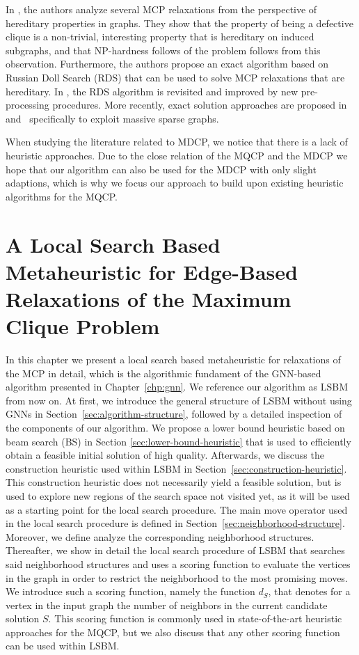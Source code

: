 \documentclass[draft,final]{vutinfth} %
\begin{document}
In \cite{Trukhanov2013}, the authors analyze several MCP relaxations from the perspective of hereditary properties in graphs. They show that the property of being a defective clique is a non-trivial, interesting property that is hereditary on induced subgraphs, and that NP-hardness follows of the problem follows from this observation. Furthermore, the authors propose an exact algorithm based on Russian Doll Search (RDS) that can be used to solve MCP relaxations that are hereditary. In \cite{GSCHWIND2018131}, the RDS algorithm is revisited and improved by new pre-processing procedures. 
More recently, exact solution approaches are proposed in~\cite{chen2021computing} and~\cite{gao2022exact} specifically to exploit massive sparse graphs. 

When studying the literature related to MDCP, we notice that there is a lack of heuristic approaches. Due to the close relation of the MQCP and the MDCP we hope that our algorithm can also be used for the MDCP with only slight adaptions, which is why we focus our approach to build upon existing heuristic algorithms for the MQCP. 

\chapter{A Local Search Based Metaheuristic for Edge-Based Relaxations of the Maximum Clique Problem}\label{chp:local-search-algorithm}

In this chapter we present a local search based metaheuristic for relaxations of the MCP in detail, which is the algorithmic fundament of the GNN-based algorithm presented in Chapter~\ref{chp:gnn}. We reference our algorithm as LSBM from now on. 
At first, we introduce the general structure of LSBM without using GNNs in Section~\ref{sec:algorithm-structure}, followed by a detailed inspection of the components of our algorithm. We propose a lower bound heuristic based on beam search (BS) in Section \ref{sec:lower-bound-heuristic} that is used to efficiently obtain a feasible initial solution of high quality. 
Afterwards, we discuss the construction heuristic used within LSBM in Section~\ref{sec:construction-heuristic}. This construction heuristic does not necessarily yield a feasible solution, but is used to explore new regions of the search space not visited yet, as it will be used as a starting point for the local search procedure. 
The main move operator used in the local search procedure is defined in Section~\ref{sec:neighborhood-structure}. Moreover, we define analyze the corresponding neighborhood structures. 
Thereafter, we show in detail the local search procedure of LSBM that searches said neighborhood structures and uses a scoring function to evaluate the vertices in the graph in order to restrict the neighborhood to the most promising moves. We introduce such a scoring function, namely the function $d_S$, that denotes for a vertex in the input graph the number of neighbors in the current candidate solution $S$. This scoring function is commonly used in state-of-the-art heuristic approaches for the MQCP, but we also discuss that any other scoring function can be used within LSBM. 
\end{document}
